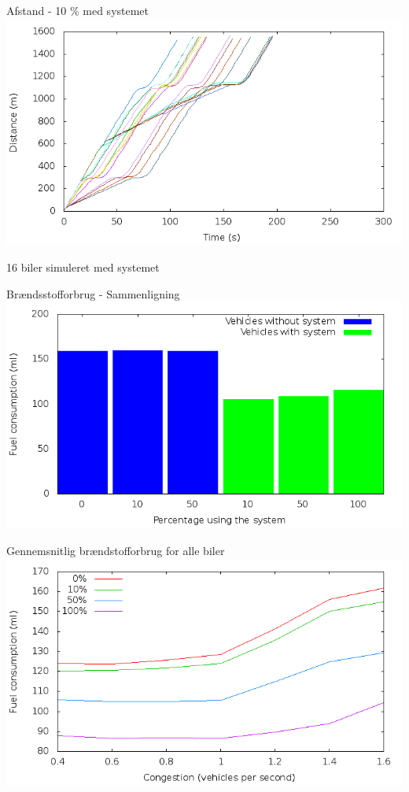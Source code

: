 \begin{frame}{Afstand - 10 \% med systemet}
\includegraphics[width=1\textwidth]{../images/tp0c0_8/distanceControlled10.png}

16 biler simuleret med systemet
\end{frame}

\begin{frame}{Brændsstofforbrug - Sammenligning}
\includegraphics[width=1\textwidth]{../images/tp0c0_8/combinedFuel.png}
\end{frame}

\begin{frame}{Gennemsnitlig brændstofforbrug for alle biler}
\includegraphics[width=1\textwidth]{../images/fuelCongestion.png}
\end{frame}

